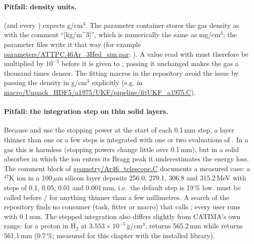\paragraph{Pitfall: density units.}
 (and every ) expects g/cm$^3$. The parameter container 
stores the gas density as  with the comment ``[kg/m\^{}3]'', which is numerically the same as
mg/cm$^3$; the parameter files write it that way (for example
\url{parameters/ATTPC.46Ar_3Hed_sim.par}: ). A value read with
 must therefore be multiplied by $10^{-3}$ before it is given to
; passing it unchanged makes the gas a thousand times denser. The fitting macros in the
repository avoid the issue by passing the density in g/cm$^3$ explicitly (e.g.  in
\url{macro/Unpack_HDF5/a1975/UKF/pipeline/fitUKF_a1975.C}).

\paragraph{Pitfall: the integration step on thin solid layers.}
Because  and  use the stopping power at the start of each 0.1\,mm step, a layer
thinner than one or a few steps is integrated with one or two evaluations of \dedx{}. In a gas this is harmless
(stopping powers change little over 0.1\,mm), but in a solid absorber in which the ion enters its Bragg peak it
underestimates the energy loss. The comment block of \url{geometry/Ar46_telescope.C} documents a measured case: a
$^{47}$K ion in a 100\,$\mu$m silicon layer deposits 256.0, 279.1, 306.8 and 315.2\,MeV with steps of 0.1, 0.05, 0.01
and 0.001\,mm, i.e.\ the default step is 19\,\% low.  must be called before
/ for anything thinner than a few millimetres. A search of the repository finds no
consumer (task, fitter or macro) that calls ; every user runs with 0.1\,mm. The stepped
integration also differs slightly from CATIMA's own range: for a proton in H$_2$ at $3.553\times10^{-5}$\,g/cm$^3$,
 returns 565.2\,mm while  returns 561.1\,mm (0.7\,\%; measured
for this chapter with the installed library).

